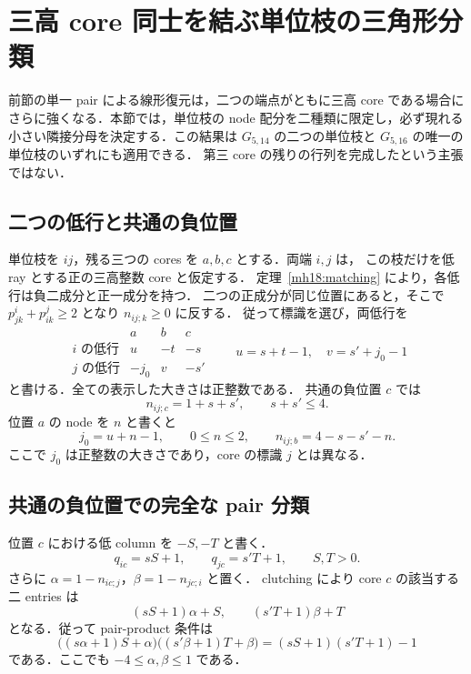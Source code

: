 \section{三高 core 同士を結ぶ単位枝の三角形分類}
\label{ut24:section}

前節の単一 pair による線形復元は，二つの端点がともに三高 core である場合に
さらに強くなる．本節では，単位枝の node 配分を二種類に限定し，必ず現れる
小さい隣接分母を決定する．この結果は $G_{5,14}$ の二つの単位枝と
$G_{5,16}$ の唯一の単位枝のいずれにも適用できる．
第三 core の残りの行列を完成したという主張ではない．

\subsection{二つの低行と共通の負位置}

単位枝を $ij$，残る三つの cores を $a,b,c$ とする．両端 $i,j$ は，
この枝だけを低 ray とする正の三高整数 core と仮定する．
定理~\ref{mh18:matching} により，各低行は負二成分と正一成分を持つ．
二つの正成分が同じ位置にあると，そこで
$p^i_{jk}+p^j_{ik}\ge2$ となり $n_{ij;k}\ge0$ に反する．
従って標識を選び，両低行を
\begin{equation}\label{ut24:low-rows}
 \begin{array}{c|ccc}
       &a&b&c\\\hline
 i\text{ の低行}&u&-t&-s\\
 j\text{ の低行}&-j_0&v&-s'
 \end{array}
 \qquad
 u=s+t-1,\quad v=s'+j_0-1
\end{equation}
と書ける．全ての表示した大きさは正整数である．
共通の負位置 $c$ では
\begin{equation}\label{ut24:small-negative-row}
 n_{ij;c}=1+s+s',\qquad s+s'\le4.
\end{equation}
位置 $a$ の node を $n$ と書くと
\begin{equation}\label{ut24:opposite-row}
 j_0=u+n-1,\qquad
 0\le n\le2,\qquad n_{ij;b}=4-s-s'-n.
\end{equation}
ここで $j_0$ は正整数の大きさであり，core の標識 $j$ とは異なる．

\subsection{共通の負位置での完全な pair 分類}

位置 $c$ における低 column を $-S,-T$ と書く．
\[
 q_{ic}=sS+1,\qquad q_{jc}=s'T+1,\qquad S,T>0.
\]
さらに $\alpha=1-n_{ic;j}$，$\beta=1-n_{jc;i}$ と置く．
clutching により core $c$ の該当する二 entries は
\[
 (sS+1)\alpha+S,\qquad(s'T+1)\beta+T
\]
となる．従って pair-product 条件は
\begin{equation}\label{ut24:negative-pair}
 \bigl((s\alpha+1)S+\alpha\bigr)
 \bigl((s'\beta+1)T+\beta\bigr)
 =(sS+1)(s'T+1)-1
\end{equation}
である．ここでも $-4\le\alpha,\beta\le1$ である．

